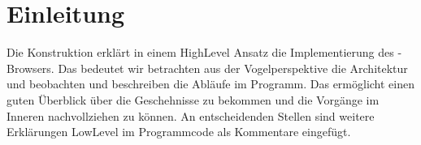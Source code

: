 
\chapter*{Einleitung}
Die Konstruktion erklärt in einem HighLevel Ansatz die Implementierung des \SECH-Browsers. Das bedeutet wir betrachten aus der Vogelperspektive die Architektur und beobachten und beschreiben die Abläufe im Programm. Das ermöglicht einen guten Überblick über die Geschehnisse zu bekommen und die Vorgänge im Inneren nachvollziehen zu können. An entscheidenden Stellen sind weitere Erklärungen LowLevel im Programmcode als Kommentare eingefügt.
